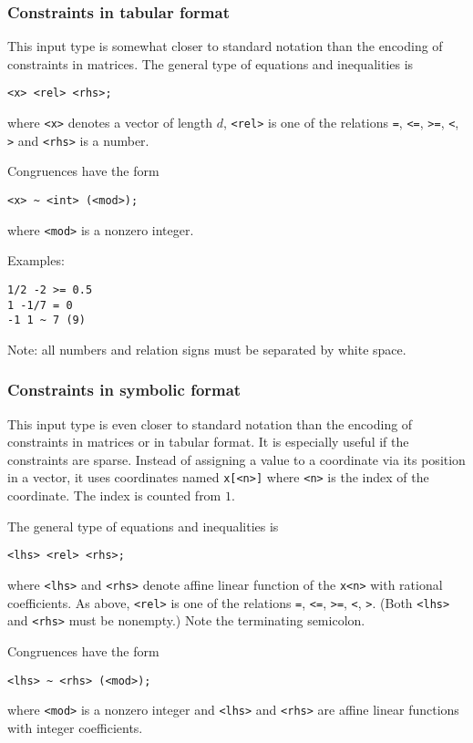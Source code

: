 \documentclass[12pt,a4paper]{scrartcl}
\theoremstyle{definition}
\begin{document}
\subsubsection{Constraints in tabular format}\label{const_syntax}

This input type is somewhat closer to standard notation than the encoding of constraints in matrices. The general type of equations and inequalities is
\begin{Verbatim}
<x> <rel> <rhs>;
\end{Verbatim}
where \verb|<x>| denotes a vector of length $d$, \verb|<rel>| is one of the relations \verb|=|, \verb|<=|, \verb|>=|, \verb|<|, \verb|>| and \verb|<rhs>| is a number.

Congruences have the form
\begin{Verbatim}
<x> ~ <int> (<mod>);
\end{Verbatim}
where \verb|<mod>| is a nonzero integer.

Examples:
\begin{Verbatim}
1/2 -2 >= 0.5
1 -1/7 = 0
-1 1 ~ 7 (9)
\end{Verbatim}

Note: all numbers and relation signs must be separated by white space.

\subsubsection{Constraints in symbolic format}\label{symb_syntax}

This input type is even closer to standard notation than the encoding of constraints in matrices or in tabular format. It is especially useful if the constraints are sparse. Instead of assigning a value to a coordinate via its position in a vector, it uses coordinates named \verb|x[<n>]| where \verb|<n>| is the index of the coordinate. The index is counted from $1$.

The general type of equations and inequalities is
\begin{Verbatim}
<lhs> <rel> <rhs>;
\end{Verbatim}
where \verb|<lhs>| and \verb|<rhs>| denote affine linear function of the \verb|x<n>| with rational coefficients.
As above, \verb|<rel>| is one of the relations \verb|=|, \verb|<=|, \verb|>=|, \verb|<|, \verb|>|. (Both \verb|<lhs>| and \verb|<rhs>| must be nonempty.) Note the terminating semicolon.

Congruences have the form
\begin{Verbatim}
<lhs> ~ <rhs> (<mod>);
\end{Verbatim}
where \verb|<mod>| is a nonzero integer and \verb|<lhs>| and \verb|<rhs>| are affine linear functions with integer coefficients.
\end{document}
